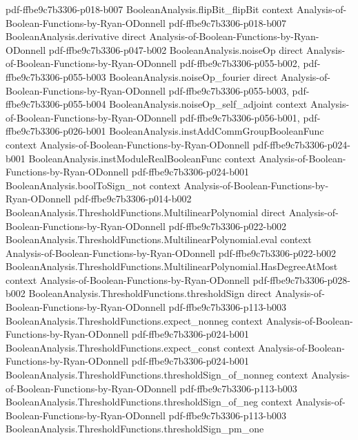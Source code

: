 \begin{theorem}
  {pdf-ffbe9c7b3306-p018-b007}
\proofstep
  {BooleanAnalysis.flipBit_flipBit}
  {context}
  {Analysis-of-Boolean-Functions-by-Ryan-ODonnell}
  {pdf-ffbe9c7b3306-p018-b007}
\proofstep
  {BooleanAnalysis.derivative}
  {direct}
  {Analysis-of-Boolean-Functions-by-Ryan-ODonnell}
  {pdf-ffbe9c7b3306-p047-b002}
\proofstep
  {BooleanAnalysis.noiseOp}
  {direct}
  {Analysis-of-Boolean-Functions-by-Ryan-ODonnell}
  {pdf-ffbe9c7b3306-p055-b002,
    pdf-ffbe9c7b3306-p055-b003}
\proofstep
  {BooleanAnalysis.noiseOp_fourier}
  {direct}
  {Analysis-of-Boolean-Functions-by-Ryan-ODonnell}
  {pdf-ffbe9c7b3306-p055-b003,
    pdf-ffbe9c7b3306-p055-b004}
\proofstep
  {BooleanAnalysis.noiseOp_self_adjoint}
  {context}
  {Analysis-of-Boolean-Functions-by-Ryan-ODonnell}
  {pdf-ffbe9c7b3306-p056-b001,
    pdf-ffbe9c7b3306-p026-b001}
\proofstep
  {BooleanAnalysis.instAddCommGroupBooleanFunc}
  {context}
  {Analysis-of-Boolean-Functions-by-Ryan-ODonnell}
  {pdf-ffbe9c7b3306-p024-b001}
\proofstep
  {BooleanAnalysis.instModuleRealBooleanFunc}
  {context}
  {Analysis-of-Boolean-Functions-by-Ryan-ODonnell}
  {pdf-ffbe9c7b3306-p024-b001}
\proofstep
  {BooleanAnalysis.boolToSign_not}
  {context}
  {Analysis-of-Boolean-Functions-by-Ryan-ODonnell}
  {pdf-ffbe9c7b3306-p014-b002}
\proofstep
  {BooleanAnalysis.ThresholdFunctions.MultilinearPolynomial}
  {direct}
  {Analysis-of-Boolean-Functions-by-Ryan-ODonnell}
  {pdf-ffbe9c7b3306-p022-b002}
\proofstep
  {BooleanAnalysis.ThresholdFunctions.MultilinearPolynomial.eval}
  {context}
  {Analysis-of-Boolean-Functions-by-Ryan-ODonnell}
  {pdf-ffbe9c7b3306-p022-b002}
\proofstep
  {BooleanAnalysis.ThresholdFunctions.MultilinearPolynomial.HasDegreeAtMost}
  {context}
  {Analysis-of-Boolean-Functions-by-Ryan-ODonnell}
  {pdf-ffbe9c7b3306-p028-b002}
\proofstep
  {BooleanAnalysis.ThresholdFunctions.thresholdSign}
  {direct}
  {Analysis-of-Boolean-Functions-by-Ryan-ODonnell}
  {pdf-ffbe9c7b3306-p113-b003}
\proofstep
  {BooleanAnalysis.ThresholdFunctions.expect_nonneg}
  {context}
  {Analysis-of-Boolean-Functions-by-Ryan-ODonnell}
  {pdf-ffbe9c7b3306-p024-b001}
\proofstep
  {BooleanAnalysis.ThresholdFunctions.expect_const}
  {context}
  {Analysis-of-Boolean-Functions-by-Ryan-ODonnell}
  {pdf-ffbe9c7b3306-p024-b001}
\proofstep
  {BooleanAnalysis.ThresholdFunctions.thresholdSign_of_nonneg}
  {context}
  {Analysis-of-Boolean-Functions-by-Ryan-ODonnell}
  {pdf-ffbe9c7b3306-p113-b003}
\proofstep
  {BooleanAnalysis.ThresholdFunctions.thresholdSign_of_neg}
  {context}
  {Analysis-of-Boolean-Functions-by-Ryan-ODonnell}
  {pdf-ffbe9c7b3306-p113-b003}
\proofstep
  {BooleanAnalysis.ThresholdFunctions.thresholdSign_pm_one}

\end{theorem}

